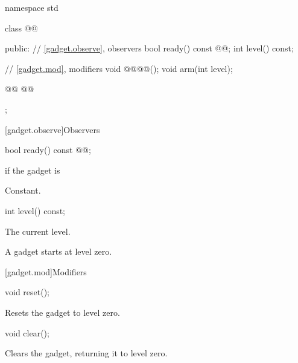 \begin{codeblock}
namespace std {
  class @@ {
  public:
    // \ref{gadget.observe}, observers
    bool ready() const @@;
    int level() const;

    // \ref{gadget.mod}, modifiers
    void @@@@();
    void arm(int level);

    @@
    @@
  };
}
\end{codeblock}

[gadget.observe]{Observers}

%
\begin{itemdecl}
bool ready() const @@;
\end{itemdecl}

\begin{itemdescr}
\pnum
\returns
{} if the gadget is 

\begin{addedblock}
\pnum
\complexity
Constant.
\end{addedblock}
\end{itemdescr}

%
\begin{itemdecl}
int level() const;
\end{itemdecl}

\begin{itemdescr}
\pnum
\returns
The current level.

\pnum
\remarks
A gadget starts at level zero.
\end{itemdescr}

[gadget.mod]{Modifiers}

\begin{removedblock}
%
\begin{itemdecl}
void reset();
\end{itemdecl}

\begin{itemdescr}
\pnum
\effects
Resets the gadget to level zero.
\end{itemdescr}
\end{removedblock}

\begin{addedblock}
%
\begin{itemdecl}
void clear();
\end{itemdecl}

\begin{itemdescr}
\pnum
\effects
Clears the gadget, returning it to level zero.
\end{itemdescr}
\end{addedblock}

